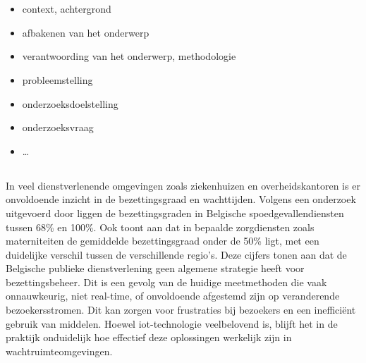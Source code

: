 
\chapter{}%
\label{ch:inleiding}


\begin{itemize}
  \item context, achtergrond
  \item afbakenen van het onderwerp
  \item verantwoording van het onderwerp, methodologie
  \item probleemstelling
  \item onderzoeksdoelstelling
  \item onderzoeksvraag
  \item \ldots
\end{itemize}

\section{}%
In veel dienstverlenende omgevingen zoals ziekenhuizen en overheidskantoren is er onvoldoende inzicht in de bezettingsgraad en wachttijden. Volgens een onderzoek uitgevoerd door \autocite{Jobe2018} liggen de bezettingsgraden in Belgische spoedgevallendiensten tussen 68\% en 100\%. Ook \autocite{Lefevre2019} toont aan dat in bepaalde zorgdiensten zoals materniteiten de gemiddelde bezettingsgraad onder de 50\% ligt, met een duidelijke verschil tussen de verschillende regio's. Deze cijfers tonen aan dat de Belgische publieke dienstverlening geen algemene strategie heeft voor bezettingsbeheer. Dit is een gevolg van de huidige meetmethoden die vaak onnauwkeurig, niet real-time, of onvoldoende afgestemd zijn op veranderende bezoekersstromen. Dit kan zorgen voor frustraties bij bezoekers en een inefficiënt gebruik van middelen. Hoewel \gls{iot}-technologie veelbelovend is, blijft het in de praktijk onduidelijk hoe effectief deze oplossingen werkelijk zijn in wachtruimteomgevingen.   %

